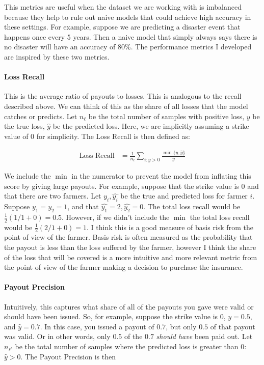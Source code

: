 \documentclass[11pt]{article}
\begin{document}
    This metrics are useful when the dataset we are working with is imbalanced because they help to rule out naive models that could achieve high accuracy in these settings. For example, suppose we are predicting a disaster event that happens once every 5 years. Then a naive model that simply always says there is no disaster will have an accuracy of $80\%$. The performance metrics I developed are inspired by these two metrics. 

    \paragraph*{Loss Recall} This is the average ratio of payouts to losses. This is analogous to the recall described above. We can think of this as the share of all losses that the model catches or predicts. Let $n_{\ell}$ be the total number of samples with positive loss, $y$ be the true loss, $\hat{y}$ be the predicted loss. Here, we are implicitly assuming a strike value of $0$ for simplicity. The Loss Recall is then defined as: 
  
      \begin{align*}
        \text{Loss Recall} &= \frac{1}{n_{\ell}} \sum_{i:y>0} \frac{\min\{ y,\hat{y}\}}{y}
      \end{align*}

      We include the $\min$ in the numerator to prevent the model from inflating this score by giving large payouts. For example, suppose that the strike value is $0$ and that there are two farmers. Let $y_i,\hat{y_i}$ be the true and predicted loss for farmer $i$. Suppose $y_1 = y_2 = 1$, and that $\hat{y_1} = 2, \hat{y_2} = 0$. The total loss recall would be $\frac{1}{2}(1/1 + 0) = 0.5$. However, if we didn't include the $\min$ the total loss recall would be $\frac{1}{2}(2/1+0) = 1$. I think this is a good measure of basis risk from the point of view of the farmer. Basis risk is often measured as the probability that the payout is less than the loss suffered by the farmer, however I think the share of the loss that will be covered is a more intuitive and more relevant metric from the point of view of the farmer making a decision to purchase the insurance. 

      \paragraph*{Payout Precision} Intuitively, this captures what share of all of the payouts you gave were valid or should have been issued. So, for example, suppose the strike value is 0, $y=0.5$, and $\hat{y} = 0.7$. In this case, you issued a payout of $0.7$, but only $0.5$ of that payout was valid. Or in other words, only $0.5$ of the $0.7$ \textit{should have} been paid out. Let $n_{s'}$ be the total number of samples where the predicted loss is greater than 0: $\hat{y} > 0$. The Payout Precision is then
\end{document}

